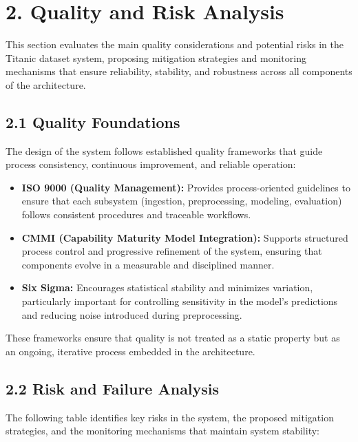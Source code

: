 \documentclass[12pt]{report}
\begin{document}
\section*{2. Quality and Risk Analysis}

This section evaluates the main quality considerations and potential risks in the Titanic
dataset system, proposing mitigation strategies and monitoring mechanisms that ensure
reliability, stability, and robustness across all components of the architecture.

\subsection*{2.1 Quality Foundations}

The design of the system follows established quality frameworks that guide process 
consistency, continuous improvement, and reliable operation:

\begin{itemize}
    \item \textbf{ISO 9000 (Quality Management):} Provides process-oriented 
    guidelines to ensure that each subsystem (ingestion, preprocessing, modeling, 
    evaluation) follows consistent procedures and traceable workflows.

    \item \textbf{CMMI (Capability Maturity Model Integration):} Supports 
    structured process control and progressive refinement of the system, ensuring 
    that components evolve in a measurable and disciplined manner.

    \item \textbf{Six Sigma:} Encourages statistical stability and minimizes 
    variation, particularly important for controlling sensitivity in the model’s 
    predictions and reducing noise introduced during preprocessing.
\end{itemize}

These frameworks ensure that quality is not treated as a static property but as an 
ongoing, iterative process embedded in the architecture.

\subsection*{2.2 Risk and Failure Analysis}

The following table identifies key risks in the system, the proposed mitigation strategies, 
and the monitoring mechanisms that maintain system stability:
\end{document}
